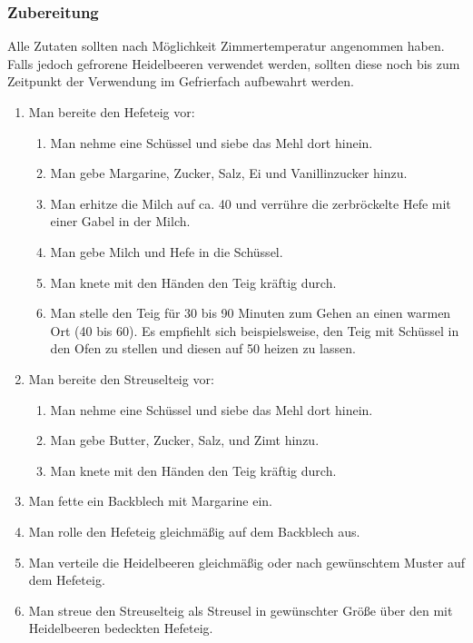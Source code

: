 \documentclass[a4paper]{book}
\begin{document}
\subsubsection{Zubereitung}
Alle Zutaten sollten nach Möglichkeit Zimmertemperatur angenommen haben. Falls jedoch gefrorene Heidelbeeren verwendet werden, sollten diese noch bis zum Zeitpunkt der Verwendung im Gefrierfach aufbewahrt werden.
\begin{enumerate}[(1)]
	\item Man bereite den Hefeteig vor:
	\begin{enumerate}[(\theenumi.1)]
		\item Man nehme eine Schüssel und siebe das Mehl dort hinein.
		\item Man gebe Margarine, Zucker, Salz, Ei und Vanillinzucker hinzu.
		\item Man erhitze die Milch auf ca. 40{\textcelsius} und verrühre die zerbröckelte Hefe mit einer Gabel in der Milch.
		\item Man gebe Milch und Hefe in die Schüssel.
		\item Man knete mit den Händen den Teig kräftig durch.
		\item Man stelle den Teig für 30 bis 90 Minuten zum Gehen an einen warmen Ort (40{\textcelsius} bis 60{\textcelsius}). Es empfiehlt sich beispielsweise, den Teig mit Schüssel in den Ofen zu stellen und diesen auf 50{\textcelsius} heizen zu lassen.
	\end{enumerate}
	\item Man bereite den Streuselteig vor:
	\begin{enumerate}[(\theenumi.1)]
		\item Man nehme eine Schüssel und siebe das Mehl dort hinein. 
		\item Man gebe Butter, Zucker, Salz, und Zimt hinzu.
		\item Man knete mit den Händen den Teig kräftig durch.
	\end{enumerate}
	\item Man fette ein Backblech mit Margarine ein.
	\item Man rolle den Hefeteig gleichmäßig auf dem Backblech aus.
	\item Man verteile die Heidelbeeren gleichmäßig oder nach gewünschtem Muster auf dem Hefeteig.
	\item Man streue den Streuselteig als Streusel in gewünschter Größe über den mit Heidelbeeren bedeckten Hefeteig.

\end{enumerate}
\end{document}
